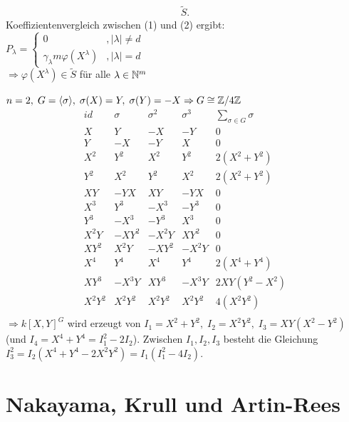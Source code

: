 \documentclass[a4paper, 10pt]{report}
\begin{document}
\begin{Bew}
\begin{enumerate}
\begin{enumerate}
\begin{equation*}
\begin{split}
      \tilde{S}.
      \end{split}
      \end{equation*}
      Koeffizientenvergleich zwischen (1) und (2) ergibt:\\
      $P_{\lambda}= \begin{cases} 0 &, |\lambda| \not= d\\ \gamma_{\lambda} m
      \varphi(X^{\lambda})&, |\lambda|=d \end{cases}$\\
      $\Rightarrow \varphi(X^{\lambda}) \in \tilde{S}$ für alle $\lambda \in \mathbb{N}^m$
    \end{enumerate}
  \end{enumerate}
\end{Bew}

\begin{nnBsp}
  $n=2, \; G=\langle \sigma \rangle, \; \sigma(X) = Y, \; \sigma(Y) = -X
  \Rightarrow G \cong \mathbb{Z}/4\mathbb{Z}$
  \[
  \begin{array}{c|c|c|c|c}
    id & \sigma & \sigma^2 & \sigma^3 & \sum_{\sigma \in G} \sigma\\
    \hline
    X & Y & -X & -Y & 0\\
    Y & -X & -Y & X & 0\\
    X^2 & Y^2 & X^2 & Y^2 & 2(X^2+Y^2)\\
    Y^2 & X^2 & Y^2 & X^2 & 2(X^2+Y^2)\\
    XY & -YX & XY & -YX & 0\\
    X^3 & Y^3 & -X^3 & -Y^3 & 0\\
    Y^3 & -X^3 & -Y^3 & X^3 & 0\\
    X^2Y & -XY^2 & -X^2Y & X Y^2 & 0\\
    X Y^2 & X^2Y & -XY^2 & -X^2Y & 0\\
    X^4 & Y^4 & X^4 & Y^4 & 2(X^4+Y^4)\\
    XY^3 & -X^3Y & XY^3 & -X^3Y & 2XY(Y^2-X^2)\\
    X^2Y^2 & X^2Y^2& X^2Y^2& X^2Y^2 & 4(X^2Y^2)\\
  \end{array}
\]
  $\Rightarrow k[X,Y]^G$ wird erzeugt von $I_1 = X^2+Y^2, \; I_2 = X^2Y^2, \;
  I_3 = XY(X^2-Y^2)$ (und $I_4 = X^4 + Y^4 = I_1^2-2I_2$). Zwischen
  $I_1,I_2,I_3$ besteht die Gleichung $I_3^2 =
  I_2(X^4+Y^4-2X^2Y^2)=I_1(I_1^2-4I_2)$.
\end{nnBsp}

\section{Nakayama, Krull und Artin-Rees}
\end{document}
